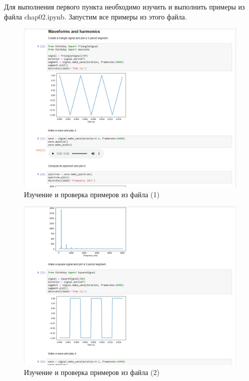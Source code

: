\documentclass[a4paper, 14pt]{extarticle}
\begin{document}
    Для выполнения первого пункта необходимо изучить и выполнить примеры из файла chap02.ipynb.
    Запустим все примеры из этого файла.

    \begin{figure}[h]
        \centering
        \includegraphics[width=\textwidth]{chap02_1}
        \caption{Изучение и проверка примеров из файла (1)}
        \label{fig:check_it_works_1}
    \end{figure}

    \begin{figure}[h]
        \centering
        \includegraphics[width=\textwidth]{chap02_2}
        \caption{Изучение и проверка примеров из файла (2)}
        \label{fig:check_it_works_2}
    \end{figure}
\end{document}
